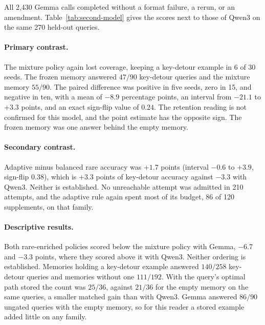 \documentclass[11pt]{article}
\begin{document}
All 2,430 Gemma calls completed without a format failure, a rerun, or
an amendment. Table~\ref{tab:second-model} gives the scores next to
those of Qwen3 on the same 270 held-out queries.



\paragraph{Primary contrast.} The mixture policy again lost coverage,
keeping a key-detour example in 6 of 30 seeds. The frozen memory
answered $47/90$ key-detour queries and the mixture memory $55/90$.
The paired difference was positive in five seeds, zero in 15, and
negative in ten, with a mean of $-8.9$ percentage points, an interval
from $-21.1$ to $+3.3$ points, and an exact sign-flip value of $0.24$.
The retention reading is not confirmed for this model, and the point
estimate has the opposite sign. The frozen memory was one answer behind
the empty memory.

\paragraph{Secondary contrast.} Adaptive minus balanced rare accuracy
was $+1.7$ points (interval $-0.6$ to $+3.9$, sign-flip $0.38$), which
is $+3.3$ points of key-detour accuracy against $-3.3$ with Qwen3.
Neither is established. No unreachable attempt was admitted in 210
attempts, and the adaptive rule again spent most of its budget, 86 of
120 supplements, on that family.

\paragraph{Descriptive results.} Both rare-enriched policies scored
below the mixture policy with Gemma, $-6.7$ and $-3.3$ points, where
they scored above it with Qwen3. Neither ordering is established.
Memories holding a key-detour example answered $140/258$ key-detour
queries and memories without one $111/192$. With the query's optimal
path stored the count was $25/36$, against $21/36$ for the empty memory
on the same queries, a smaller matched gain than with Qwen3. Gemma
answered $86/90$ ungated queries with the empty memory, so for this
reader a stored example added little on any family.
\end{document}
